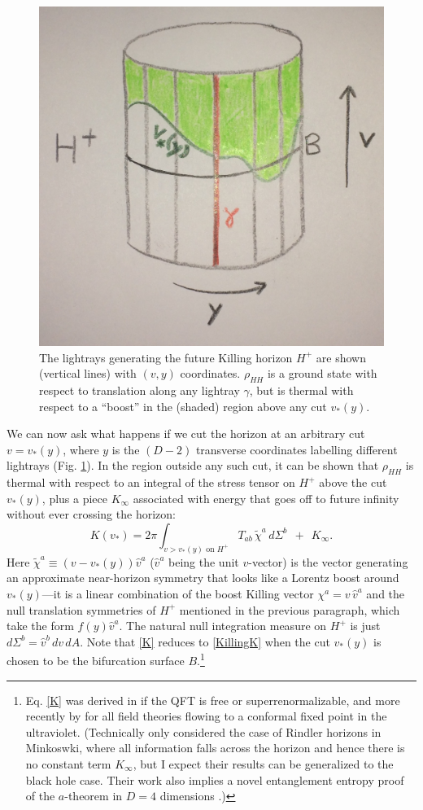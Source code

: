 \documentclass[12pt,a4paper]{article}
\def\be{\begin{equation}}
\def\ee{\end{equation}}
\begin{document}
\begin{figure}[ht]
\centering
\includegraphics[width=.6\textwidth]{raycut.jpg}
\caption{\small The lightrays generating the future Killing horizon $H^+$ are shown (vertical lines) with $(v,y)$ coordinates.  $\rho_{HH}$ is a ground state with respect to translation along any lightray $\gamma$, but is thermal with respect to a ``boost'' in the (shaded) region above any cut $v_*(y)$.}\label{fig:raycut}
\end{figure}

We can now ask what happens if we cut the horizon at an arbitrary cut $v = v_*(y)$, where $y$ is the $(D-2)$ transverse coordinates labelling different lightrays (Fig. \ref{fig:raycut}).  In the region outside any such cut, it can be shown that $\rho_{HH}$ is thermal with respect to an integral of the stress tensor on $H^+$ above the cut $v_*(y)$, plus a piece $K_\infty$ associated with energy that goes off to future infinity without ever crossing the horizon:
\be\label{K}
K(v_*) = 2\pi \int_{v > v_*(y) \text{ on } H^+}\!\!\!\!\!\!\! \!\!\!\!\!\!\! \!\!\!\!\!\!\! \!\!\!
T_{ab}\,\widetilde{\chi}^a\,d\Sigma^b \:\:+\:\: K_\infty.
\ee
Here $\widetilde{\chi}^a \equiv (v - v_*(y))\hat{v}^a$ ($\hat{v}^a$ being the unit $v$-vector) is the vector generating an approximate near-horizon symmetry that looks like a Lorentz boost around $v_*(y)$---it is a linear combination of the boost Killing vector $\chi^a = v\,\hat{v}^a$ and the null translation symmetries of $H^+$ mentioned in the previous paragraph, which take the form $f(y) \hat{v}^a$.  The natural null integration measure on $H^+$ is just $d\Sigma^b = \hat{v}^b\,dv\,dA$.  Note that \eqref{K} reduces to \eqref{KillingK} when the cut $v_*(y)$ is chosen to be the bifurcation surface $B$.\footnote{Eq. \eqref{K} was derived in \cite{wall2011} if the QFT is free or superrenormalizable, and more recently by \cite{Casini:2017roe} for all field theories flowing to a conformal fixed point in the ultraviolet. (Technically \cite{Casini:2017roe} only considered the case of Rindler horizons in Minkoswki, where all information falls across the horizon and hence there is no constant term $K_\infty$, but I expect their results can be generalized to the black hole case.  Their work also implies a novel entanglement entropy proof of the $a$-theorem in $D = 4$ dimensions \cite{Casini:2017vbe}.)}
\end{document}
